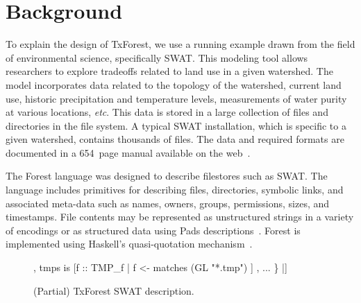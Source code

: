 \section{Background}
\label{sec:Background}


To explain the design of TxForest, we use a running example drawn from
the field of environmental science, specifically SWAT.  This modeling
tool allows researchers to explore tradeoffs related to land use in a
given watershed.  The model incorporates data related to the topology
of the watershed, current land use, historic precipitation and
temperature levels, measurements of water purity at various locations,
\textit{etc}.  This data is stored in a large collection of files and
directories in the file system.  A typical SWAT installation, which is
specific to a given watershed, contains thousands of files.  The data
and required formats are documented in a 654~page manual available on
the web~\cite{SWAT-IO-Documentation}.

The Forest language was designed to describe filestores such as SWAT.
The language includes primitives for describing files, directories,
symbolic links, and associated meta-data such as names, owners,
groups, permissions, sizes, and timestamps.  File contents may be
represented as unstructured strings in a variety of encodings or as
structured data using Pads
descriptions~\cite{fisher+:pads,fisher-walker:icdt}. Forest is
implemented using Haskell's quasi-quotation mechanism~\cite{Mainland:quasi}.

\begin{figure}
\begin{code}
[txforest|
  \kw{data} Preamble\_f  = File Preamble
  data BSN\_f       = File SwatFile
  data PCP\_f       = File PCP
  data TMP\_f       = File TMP

  data Flow\_f      = File Flow                  
  data RCH\_f       = File RCH                   
  data Deviation\_f = File Deviation     
  ...                                        
  data Swat\_d = Directory 
     \{ cio \kw{is} "file.cio" :: Preamble\_f      
     , basin is <| getBasinPath cio |> :: BSN\_f          
     , pcps  is [f :: PCP\_f | f <- matches (GL "*.pcp") ] 
     , tmps  is [f :: TMP\_f | f <- matches (GL "*.tmp") ] 
     , ...
     \}
|]
\end{code}
\caption{(Partial) TxForest SWAT description. }
\label{fig:SWAT-description}
\end{figure}


